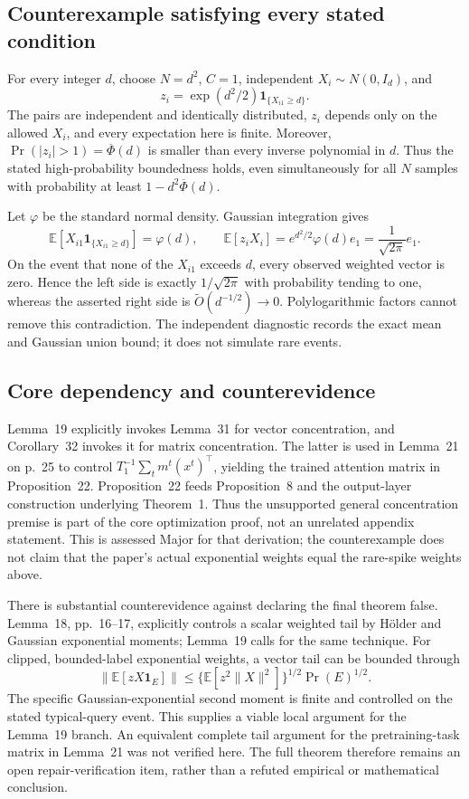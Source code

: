 \documentclass[10pt]{article}
\begin{document}
\subsection*{Counterexample satisfying every stated condition}
For every integer \(d\), choose \(N=d^2\), \(C=1\), independent \(X_i\sim N(0,I_d)\), and \[z_i=\exp(d^2/2)\mathbf1_{\{X_{i1}\ge d\}}.\] The pairs are independent and identically distributed, \(z_i\) depends only on the allowed \(X_i\), and every expectation here is finite. Moreover, \(\Pr(|z_i|>1)=\overline\Phi(d)\) is smaller than every inverse polynomial in \(d\). Thus the stated high-probability boundedness holds, even simultaneously for all \(N\) samples with probability at least \(1-d^2\overline\Phi(d)\).\par
Let \(\varphi\) be the standard normal density. Gaussian integration gives \[\mathbb E[X_{i1}\mathbf1_{\{X_{i1}\ge d\}}]=\varphi(d),
 \qquad
 \mathbb E[z_iX_i]=e^{d^2/2}\varphi(d)e_1
                 =\frac1{\sqrt{2\pi}}e_1 .\] On the event that none of the \(X_{i1}\) exceeds \(d\), every observed weighted vector is zero. Hence the left side is exactly \(1/\sqrt{2\pi}\) with probability tending to one, whereas the asserted right side is \(\widetilde O(d^{-1/2})\to0\). Polylogarithmic factors cannot remove this contradiction. The independent diagnostic records the exact mean and Gaussian union bound; it does not simulate rare events.\par
\subsection*{Core dependency and counterevidence}
Lemma 19 explicitly invokes Lemma 31 for vector concentration, and Corollary 32 invokes it for matrix concentration. The latter is used in Lemma 21 on p. 25 to control \(T_1^{-1}\sum_t m^t(x^t)^\top\), yielding the trained attention matrix in Proposition 22. Proposition 22 feeds Proposition 8 and the output-layer construction underlying Theorem 1. Thus the unsupported general concentration premise is part of the core optimization proof, not an unrelated appendix statement. This is assessed Major for that derivation; the counterexample does not claim that the paper’s actual exponential weights equal the rare-spike weights above.\par
There is substantial counterevidence against declaring the final theorem false. Lemma 18, pp. 16–17, explicitly controls a scalar weighted tail by Hölder and Gaussian exponential moments; Lemma 19 calls for the same technique. For clipped, bounded-label exponential weights, a vector tail can be bounded through \[\|\mathbb E[zX\mathbf1_E]\|
 \le \{\mathbb E[z^2\|X\|^2]\}^{1/2}\Pr(E)^{1/2}.\] The specific Gaussian-exponential second moment is finite and controlled on the stated typical-query event. This supplies a viable local argument for the Lemma 19 branch. An equivalent complete tail argument for the pretraining-task matrix in Lemma 21 was not verified here. The full theorem therefore remains an open repair-verification item, rather than a refuted empirical or mathematical conclusion.\par
\end{document}
